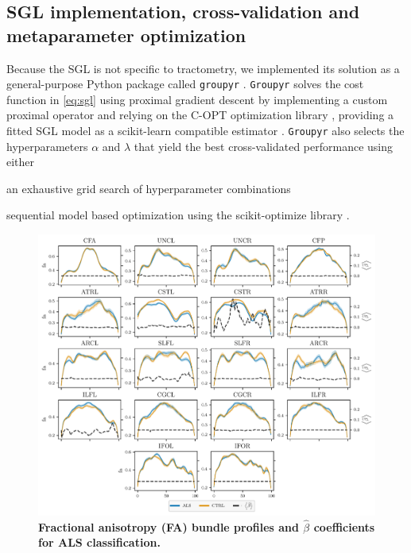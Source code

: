 \documentclass[10pt,%
               aps,%
               prl,%
               reprint,%
               superscriptaddress,%
               preprintnumbers,%
               linenumbers,%
               amsmath,%
               floatfix]{revtex4-2}
\begin{document}
\subsection{SGL implementation, cross-validation and metaparameter optimization}

Because the SGL is not specific to tractometry, we implemented its solution as
a general-purpose Python package called \texttt{groupyr} \cite{groupyr}.
\texttt{Groupyr} solves the cost function in \cref{eq:sgl} using proximal
gradient descent \cite{parikh2014proximal} by implementing a custom proximal
operator and relying on the C-OPT optimization library \cite{copt}, providing
a fitted SGL model as a scikit-learn compatible estimator \cite{sklearn_api}.
\texttt{Groupyr} also selects the hyperparameters $\alpha$ and $\lambda$ that
yield the best cross-validated performance using either
\begin{enumerate*}[%
    label=(\roman*),%
    before=\unskip{: },%
    itemjoin={{, }},%
    itemjoin*={{, or }}]
    \item an exhaustive grid search of hyperparameter combinations
    \item sequential model based optimization using the scikit-optimize
    library \cite{scikit_optimize}.
\end{enumerate*}

\begin{figure}
    \includegraphics[width=\textwidth]{sarica_coefs_profiles_fa.pdf}
    \caption{%
        {%
            \bf Fractional anisotropy (FA) bundle profiles and $\hat{\beta}$
            coefficients for ALS classification.
        }
        \label{fig:als-bp:fa}
    }
\end{figure}
\end{document}
